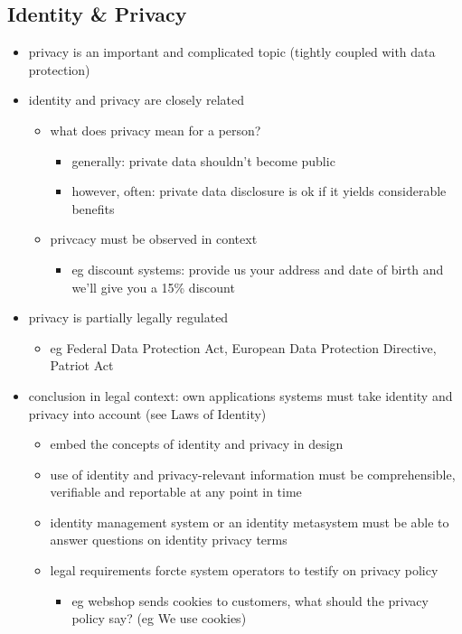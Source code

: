 \documentclass[11pt]{article}
\begin{document}
\subsection{Identity \& Privacy}
\label{sec:org8d6704c}
\begin{itemize}
\item privacy is an important and complicated topic (tightly coupled with data protection)
\item identity and privacy are closely related
\begin{itemize}
\item what does privacy mean for a person?
\begin{itemize}
\item generally: private data shouldn't become public
\item however, often: private data disclosure is ok if it yields considerable benefits
\end{itemize}
\item privcacy must be observed in context
\begin{itemize}
\item eg discount systems: provide us your address and date of birth and we'll give you a 15\% discount
\end{itemize}
\end{itemize}
\item privacy is partially legally regulated
\begin{itemize}
\item eg Federal Data Protection Act, European Data Protection Directive, Patriot Act
\end{itemize}
\item conclusion in legal context: own applications systems must take identity and privacy into account (see Laws of Identity)
\begin{itemize}
\item embed the concepts of identity and privacy in design
\item use of identity and privacy-relevant information must be comprehensible, verifiable and reportable at any point in time
\item identity management system or an identity metasystem must be able to answer questions on identity privacy terms
\item legal requirements forcte system operators to testify on privacy policy
\begin{itemize}
\item eg webshop sends cookies to customers, what should the privacy policy say? (eg We use cookies)

\end{itemize}
\end{itemize}
\end{itemize}
\end{document}
